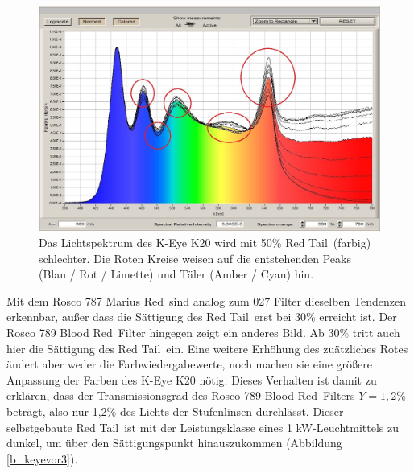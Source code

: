 \begin{figure}[H]     %
\centering
\includegraphics[width=1.0\textwidth]{bilder/keyevor2} 
\caption {Das Lichtspektrum des K-Eye K20 wird mit 50\% \glqq Red Tail\grqq\ (farbig) schlechter. Die Roten Kreise weisen auf die entstehenden Peaks (Blau / Rot / Limette) und Täler (Amber / Cyan) hin.}\label{b_keyevor2}
\end{figure}

\newpage
\noindent Mit dem Rosco 787 \glqq Marius Red\grqq\ sind analog zum 027 Filter dieselben Tendenzen erkennbar, außer dass die Sättigung des \glqq Red Tail\grqq\ erst bei 30\% erreicht ist.
Der Rosco 789 \glqq Blood Red\grqq\ Filter hingegen zeigt ein anderes Bild. Ab 30\% tritt auch hier die Sättigung des \glqq Red Tail\grqq\ ein. Eine weitere Erhöhung des zuätzliches Rotes ändert aber weder die Farbwiedergabewerte, noch machen sie eine größere Anpassung der Farben des K-Eye K20 nötig. Dieses Verhalten ist damit zu erklären, dass der Transmissionsgrad des Rosco 789 \glqq Blood Red\grqq\ Filters  $Y=1,2\%$ beträgt, also nur 1,2\% des Lichts der Stufenlinsen durchlässt. Dieser selbstgebaute \glqq Red Tail\grqq\ ist mit der Leistungsklasse eines 1 kW-Leuchtmittels zu dunkel, um über den Sättigungspunkt hinauszukommen (Abbildung \ref{b_keyevor3}).  

